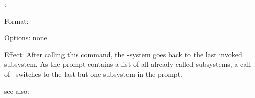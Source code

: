 \colab{} \back:

Format: 

Options: none

Effect: After calling this command, the \COLAB{}-system goes back to the
        last invoked subsystem. As the \COLAB{} prompt contains a list of
	all already called subsystems, a call of \back \ switches 
	to the last but one subsystem in the prompt.

see also: 
